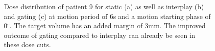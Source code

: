 \documentclass[type=dr, dr=rernat, accentcolor=tud7b,colorbacktitle, bigchapter, openright, twoside, 12pt ]{tudthesis}
\begin{document}
\newpage

 \begin{figure}[H]
 \begin{center}
\caption{Dose distribution of patient 9 for static (a) as well as interplay (b) and gating (c) at motion period of 6s and a motion starting 
phase of 0$^{\circ}$. The target volume has an added margin of 3mm. The improved outcome of gating compared to interplay 
can already be seen in these dose cuts.}
\label{dose_pat122}
 \end{center}
\end{figure}
\end{document}
